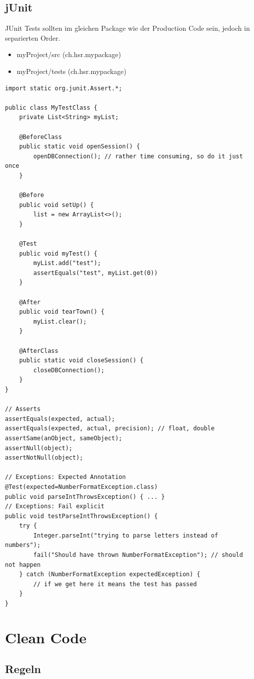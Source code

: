 \clearpage

\subsection{jUnit}
JUnit Tests sollten im gleichen Package wie der Production Code sein, jedoch in separierten Order.
\begin{itemize}
	\item myProject/src (ch.hsr.mypackage)
	\item myProject/tests (ch.hsr.mypackage)
\end{itemize}

\begin{lstlisting}
import static org.junit.Assert.*;

public class MyTestClass {
	private List<String> myList;
	
	@BeforeClass
	public static void openSession() {
		openDBConnection(); // rather time consuming, so do it just once
	}
	
	@Before
	public void setUp() { 
		list = new ArrayList<>();
	}

	@Test
	public void myTest() { 
		myList.add("test");
		assertEquals("test", myList.get(0))
	}
	
	@After
	public void tearTown() {
		myList.clear();
	}
	
	@AfterClass
	public static void closeSession() {
		closeDBConnection();
	}
}

// Asserts
assertEquals(expected, actual);
assertEquals(expected, actual, precision); // float, double
assertSame(anObject, sameObject);
assertNull(object);
assertNotNull(object); 

// Exceptions: Expected Annotation
@Test(expected=NumberFormatException.class)
public void parseIntThrowsException() { ... }
// Exceptions: Fail explicit
public void testParseIntThrowsException() {
	try {
		Integer.parseInt("trying to parse letters instead of numbers");
		fail("Should have thrown NumberFormatException"); // should not happen
	} catch (NumberFormatException expectedException) {
		// if we get here it means the test has passed
	}
}

\end{lstlisting}

\section{Clean Code}
\subsection{Regeln}
